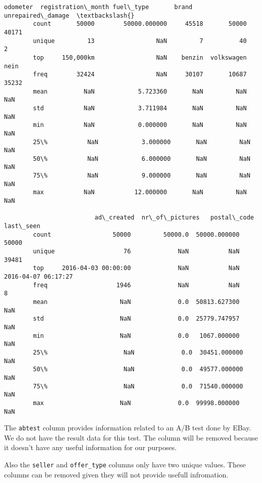 \documentclass[11pt]{article}
\begin{document}
\begin{Verbatim}[commandchars=\\\{\}]
                 odometer  registration\_month fuel\_type       brand unrepaired\_damage  \textbackslash{}
        count       50000        50000.000000     45518       50000             40171   
        unique         13                 NaN         7          40                 2   
        top     150,000km                 NaN    benzin  volkswagen              nein   
        freq        32424                 NaN     30107       10687             35232   
        mean          NaN            5.723360       NaN         NaN               NaN   
        std           NaN            3.711984       NaN         NaN               NaN   
        min           NaN            0.000000       NaN         NaN               NaN   
        25\%           NaN            3.000000       NaN         NaN               NaN   
        50\%           NaN            6.000000       NaN         NaN               NaN   
        75\%           NaN            9.000000       NaN         NaN               NaN   
        max           NaN           12.000000       NaN         NaN               NaN   
        
                         ad\_created  nr\_of\_pictures   postal\_code            last\_seen  
        count                 50000         50000.0  50000.000000                50000  
        unique                   76             NaN           NaN                39481  
        top     2016-04-03 00:00:00             NaN           NaN  2016-04-07 06:17:27  
        freq                   1946             NaN           NaN                    8  
        mean                    NaN             0.0  50813.627300                  NaN  
        std                     NaN             0.0  25779.747957                  NaN  
        min                     NaN             0.0   1067.000000                  NaN  
        25\%                     NaN             0.0  30451.000000                  NaN  
        50\%                     NaN             0.0  49577.000000                  NaN  
        75\%                     NaN             0.0  71540.000000                  NaN  
        max                     NaN             0.0  99998.000000                  NaN  
\end{Verbatim}
            
    The \texttt{abtest} column provides information related to an A/B test
done by EBay. We do not have the result data for this test. The column
will be removed because it doesn't have any useful information for our
purposes.

Also the \texttt{seller} and \texttt{offer\_type} columns only have two
unique values. These columns can be removed given they will not provide
usefull infromation.
\end{document}
